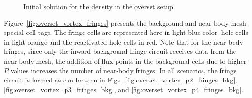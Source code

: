 \begin{figure}[H]
	\centering
	\caption{Initial solution for the density in the overset setup.}
    \label{fig:overset_vortex_initial solution}
\end{figure}

Figure\ \ref{fig:overset_vortex_fringes} presents the background and near-body mesh special cell tags. The fringe cells are represented here in light-blue color, hole cells in light-orange and the reactivated hole cells in red. Note that for the near-body fringes, since only the inward background fringe circuit receives data from the near-body mesh, the addition of flux-points in the background cells due to higher $P$ values increases the number of near-body fringes. In all scenarios, the fringe circuit is formed as can be seen in Figs.\ \ref{fig:overset_vortex_p2_fringes_bkg}, \ref{fig:overset_vortex_p3_fringes_bkg}, and \ref{fig:overset_vortex_p4_fringes_bkg}.

